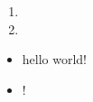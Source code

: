 \documentclass{article}
\begin{document}
\section{ }
\begin{description}
	\item[ ]
	\item[ ] \begin{enumerate}
			\item  
			\item  
		\end{enumerate}
	\item[ ] \begin{itemize}
			\item hello world!

			\item  ! \cite{Varju2018}
		\end{itemize}
\end{description}



\sectionbreak

\end{document}
